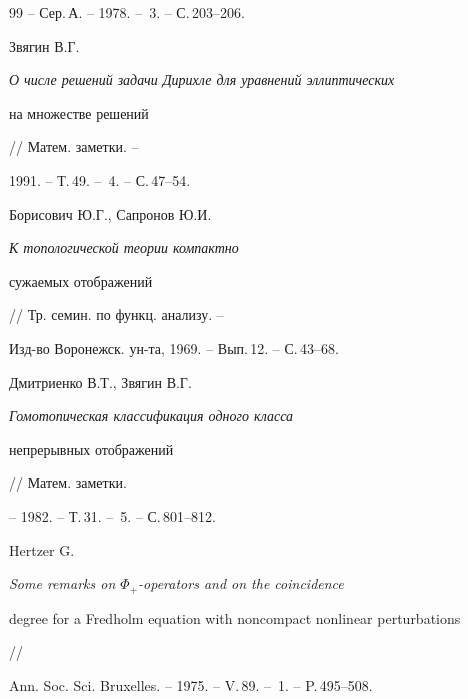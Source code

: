 \begin{thebibliography}{99}
-- Сер.\,А. -- 1978. -- \No\,3. -- С.\,203--206.







Звягин В.Г. {\em О числе решений задачи Дирихле для уравнений эллиптических


на множестве решений} // Матем. заметки. --


1991. -- Т.\,49. -- \No\,4. -- С.\,47--54.







Борисович Ю.Г., Сапронов Ю.И. {\em К топологической теории компактно 


сужаемых отображений} // Тр. семин. по функц. анализу. --


Изд-во Воронежск. ун-та, 1969. -- Вып.\,12. -- С.\,43--68.







Дмитриенко В.Т., Звягин В.Г. {\em Гомотопическая классификация одного класса


непрерывных отображений} // Матем. заметки.


-- 1982. -- Т.\,31. -- \No\,5. -- С.\,801--812.







Hertzer G. {\em Some remarks on $\Phi_+$-operators and on the coincidence


degree for a Fredholm equation with noncompact nonlinear perturbations} //


Ann. Soc. Sci. Bruxelles. -- 1975. -- V.\,89. -- \No\,1. -- P.\,495--508.





\end{thebibliography}





\vskip 2cm












\label{end}





